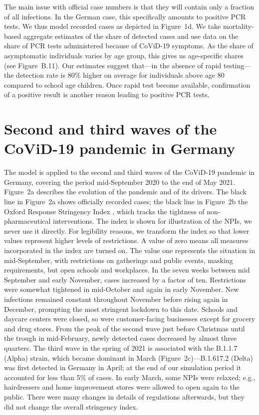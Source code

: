 \documentclass[fleqn,10pt]{wlscirep}
\begin{document}
The main issue with official case numbers is that they will contain only a fraction of
all infections. In the German case, this specifically amounts to positive PCR tests. We
thus model recorded cases as depicted in Figure~1d. We take mortality-based aggregate
estimates of the share of detected cases and use data on the share of PCR tests
administered because of CoViD-19 symptoms. As the share of asymptomatic individuals
varies by age group, this gives us age-specific shares (see Figure~B.11). Our estimates
suggest that---in the absence of rapid testing---the detection rate is 80\% higher on
average for individuals above age 80 compared to school age children. Once rapid test
become available, confirmation of a positive result is another reason leading to
positive PCR tests.


\section*{Second and third waves of the CoViD-19 pandemic in Germany}

The model is applied to the second and third waves of the CoViD-19 pandemic in Germany,
covering the period mid-September 2020 to the end of May 2021. Figure~2a describes the
evolution of the pandemic and of its drivers. The black line in Figure~2a shows
officially recorded cases; the black line in Figure~2b the Oxford Response Stringency
Index \cite{Hale2020}, which tracks the tightness of non-pharmaceutical interventions.
The index is shown for illustration of the NPIs, we never use it directly. For
legibility reasons, we transform the index so that lower values represent higher levels
of restrictions. A value of zero means all measures incorporated in the index are turned
on. The value one represents the situation in mid-September, with restrictions on
gatherings and public events, masking requirements, but open schools and workplaces. In
the seven weeks between mid September and early November, cases increased by a factor of
ten. Restrictions were somewhat tightened in mid-October and again in early November.
New infections remained constant throughout November before rising again in December,
prompting the most stringent lockdown to this date. Schools and daycare centers were
closed, so were customer-facing businesses except for grocery and drug stores. From the
peak of the second wave just before Christmas until the trough in mid-February, newly
detected cases decreased by almost three quarters. The third wave in the spring of 2021
is associated with the B.1.1.7 (Alpha) strain, which became dominant in March
(Figure~2c)---B.1.617.2 (Delta) was first detected in Germany in April; at the end of
our simulation period it accounted for less than 5\% of cases. In early March, some NPIs
were relaxed; e.g., hairdressers and home improvement stores were allowed to open again
to the public. There were many changes in details of regulations afterwards, but they
did not change the overall stringency index.
\end{document}
